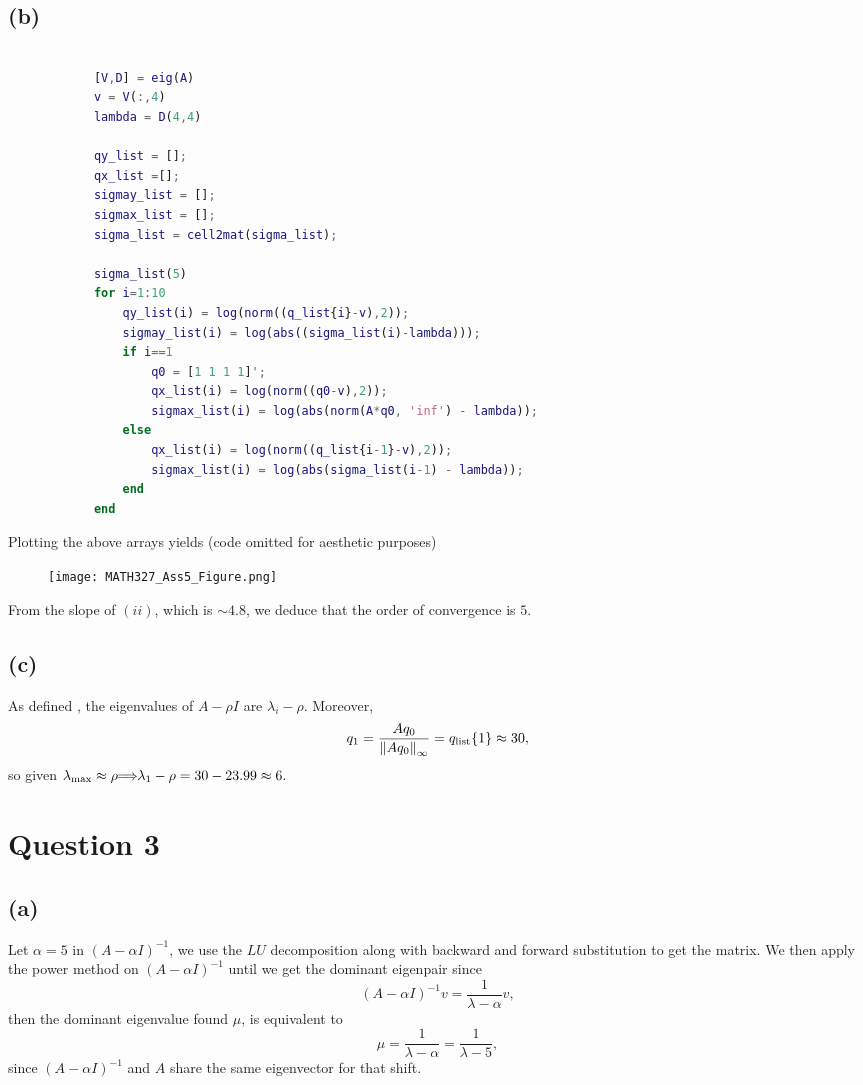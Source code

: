 \documentclass[12pt]{article}
\let\oldimplies\implies
\renewcommand*{\implies}{
	\hspace{-0.05cm}\resizebox{.95\width}{\height}{$\oldimplies$}\hspace{-0.05cm}
}
\begin{document}
		\subsection*{(b)}
			\begin{lstlisting}[language=Matlab, xleftmargin=-10em, showstringspaces=true]
			%%%% b %%%%
			
			[V,D] = eig(A)
			v = V(:,4)
			lambda = D(4,4)
			
			qy_list = [];
			qx_list =[];
			sigmay_list = [];
			sigmax_list = [];
			sigma_list = cell2mat(sigma_list);
			
			sigma_list(5)
			for i=1:10
				qy_list(i) = log(norm((q_list{i}-v),2));
				sigmay_list(i) = log(abs((sigma_list(i)-lambda)));
				if i==1
					q0 = [1 1 1 1]';
					qx_list(i) = log(norm((q0-v),2));
					sigmax_list(i) = log(abs(norm(A*q0, 'inf') - lambda));
				else 
					qx_list(i) = log(norm((q_list{i-1}-v),2));
					sigmax_list(i) = log(abs(sigma_list(i-1) - lambda));
				end
			end
			\end{lstlisting}
			Plotting the above arrays yields (code omitted for aesthetic purposes)
			\begin{figure}[H]
				\centering
				\texttt{[image: MATH327\_Ass5\_Figure.png]}
				\captionsetup{margin=1cm}
			\end{figure}
			From the slope of $(ii)$, which is $\sim 4.8$, we deduce that the order of convergence is $5$.
		\subsection*{(c)}
			As defined , the eigenvalues of $A - \rho I $ are  $\lambda_{i} - \rho$. Moreover, 
			$$ q_{1} = \frac{Aq_{0}}{\norm{A q_{0}}_{\infty}} = q_{\text{list}}\{1\} \approx 30, $$
			so given $\lambda_{\text{max}} \approx \rho \implies \lambda_{1} - \rho = 30 - 23.99 \approx 6.$
			
	\section*{Question 3}
		\subsection*{(a)}
		Let $\alpha =5$ in $(A - \alpha I)^{-1}$, we use the $LU$ decomposition along with backward and forward substitution to get the matrix. We then apply the power method on $(A - \alpha I)^{-1}$ until we get the dominant eigenpair since 
		$$ (A - \alpha I )^{-1} v = \frac{1}{\lambda - \alpha } v ,$$
		then the dominant eigenvalue found $\mu$, is equivalent to 
		$$ \mu = \frac{1}{\lambda - \alpha} = \frac{1}{\lambda -5},$$
		since $(A- \alpha I)^{-1}$ and $A$ share the same eigenvector for that shift. \\
		
\end{document}
